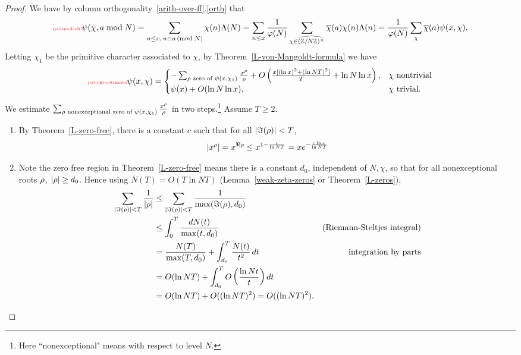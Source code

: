 \begin{proof}
We have by column orthogonality~\ref{arith-over-ff}.\ref{orth} that
\begin{equation}\llabel{psi-mod-chi}
\psi(\chi,a\bmod N)=
\sum_{n\le x,\,n\equiv a\md N}\chi(n)\La(N)
=\sum_{n\le x}\rc{\ph(N)}\sum_{\chi\in \widehat{(\Z/N\Z)^{\times}}}\ol{\chi}(a) \chi(n) \La(n)
=\rc{\ph(N)}\sum_{\chi} \ol{\chi}(a)\psi(x,\chi).
\end{equation}
Letting $\chi_1$ be the primitive character associated to $\chi$, by Theorem~\ref{L-von-Mangoldt-formula} we have
\begin{equation}\llabel{psi-chi-estimate}
\psi(x,\chi)=\begin{cases}
-\sum_{\rho\text{ zero of }\psi(x,\chi_1)} \frac{x^{\rh}}{\rh} +O
\pa{
\frac{x[(\ln x)^2+(\ln NT)^2]}{T}+\ln N\ln x} ,&\chi\text{ nontrivial}\\
\psi(x)+O(\ln N\ln x),&\chi\text{ trivial}.
\end{cases}
\end{equation}
We estimate $\sum_{\rho\text{ nonexceptional zero of }\psi(x,\chi_1)} \frac{x^{\rho}}{\rho}$ in two steps.\footnote{Here ``nonexceptional" means with respect to level $N$.} %
Assume $T\ge 2$.
\begin{enumerate}
\item By Theorem~\ref{L-zero-free}, there is a constant $c$ such that for all $|\Im(\rho)|<T$,
\[
|x^{\rho}|=x^{\Re\rho}\le x^{1-\frac{c}{\ln NT}}=xe^{-\frac{c\ln x}{\ln NT}}
\]
\item Note the zero free region in Theorem~\ref{L-zero-free} means there is a constant $d_0$, independent of $N,\chi$, so that for all nonexceptional roots $\rho$, $|\rho|\ge d_0$. Hence using $N(T)=O(T\ln NT)$ (Lemma~\ref{weak-zeta-zeros} or Theorem~\ref{L-zeros}),
\begin{align*}
\sum_{|\Im(\rho)|<T}\frac{1}{\left| {\rho} \right|}
&\le \sum_{|\Im(\rho)|<T}\frac{1}{\max(\Im(\rho),d_0)}\\
&\le \int_0^{T} \frac{dN(t)}{\max(t,d_0)}&\text{(Riemann-Steltjes integral)}\\
&= \frac{N(T)}{\max(T,d_0)}+\int_{d_0}^T \frac{N(t)}{t^2}\,dt
&\text{integration by parts}\\
&=O(\ln NT)+\int_{d_0}^T O\left( {\frac{\ln Nt}{t}} \right)dt\\
&=O(\ln NT)+O((\ln NT)^2)=O((\ln NT)^2).
\end{align*}

\end{enumerate}
\end{proof}

